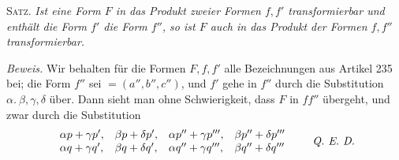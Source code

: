 \textsc{Satz.} \textit{Ist eine Form $F$ in das Produkt zweier Formen $f,f'$ transformierbar und enthält die Form $f'$ die Form $f''$, so ist $F$ auch in das Produkt der Formen $f,f''$ transformierbar.}

\textit{Beweis.} Wir behalten für die Formen $F,f,f'$ alle Bezeichnungen aus Artikel 235 bei; die Form $f''$ sei $=(a'',b'',c'')$, und $f'$ gehe in $f''$ durch die Substitution $\alpha.\ \beta,\gamma,\delta$ über. Dann sieht man ohne Schwierigkeit, dass $F$ in $ff''$ übergeht, und zwar durch die Substitution
\[
\begin{array}{llll}
\alpha p+\gamma p',&\beta p+\delta p',&\alpha p''+\gamma p''',&\beta p''+\delta p'''\\
\alpha q+\gamma q',&\beta q+\delta q',&\alpha q''+\gamma q''',&\beta q''+\delta q'''
\end{array}
\qquad\text{\textit{Q. E. D.}}
\]

